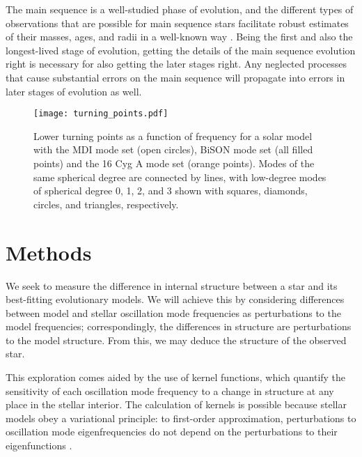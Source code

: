\documentclass[twocolumn,twocolappendix]{aastex6}
\begin{document}
The main sequence is a well-studied phase of evolution, and the different types of observations that are possible for main sequence stars facilitate robust estimates of their masses, ages, and radii in a well-known way \citep{2017ApJ...839..116A}. Being the first and also the longest-lived stage of evolution, getting the details of the main sequence evolution right is necessary for also getting the later stages right. Any neglected processes that cause substantial errors on the main sequence will propagate into errors in later stages of evolution as well. 


\begin{figure}%
    \centering
    \texttt{[image: turning\_points.pdf]}
    \caption{Lower turning points as a function of frequency for a solar model with the MDI mode set (open circles), BiSON mode set (all filled points) and the 16 Cyg A mode set (\textcolor{turn-orange}{orange} points). Modes of the same spherical degree are connected by lines, with low-degree modes of spherical degree 0, 1, 2, and 3 shown with squares, diamonds, circles, and triangles, respectively. } 
    \label{fig:turning-points}
\end{figure}




\section{Methods} 
We seek to measure the difference in internal structure between a star and its best-fitting evolutionary models. 
We will achieve this by considering differences between model and stellar oscillation mode frequencies as perturbations to the model frequencies; correspondingly, the differences in structure are perturbations to the model structure. From this, we may deduce the structure of the observed star. 

This exploration comes aided by the use of kernel functions, which quantify the sensitivity of each oscillation mode frequency to a change in structure at any place in the stellar interior. The calculation of kernels is possible because stellar models obey a variational principle: to first-order approximation, perturbations to oscillation mode eigenfrequencies do not depend on the perturbations to their eigenfunctions \citep{Chandrasekhar1964}. 
\end{document}
